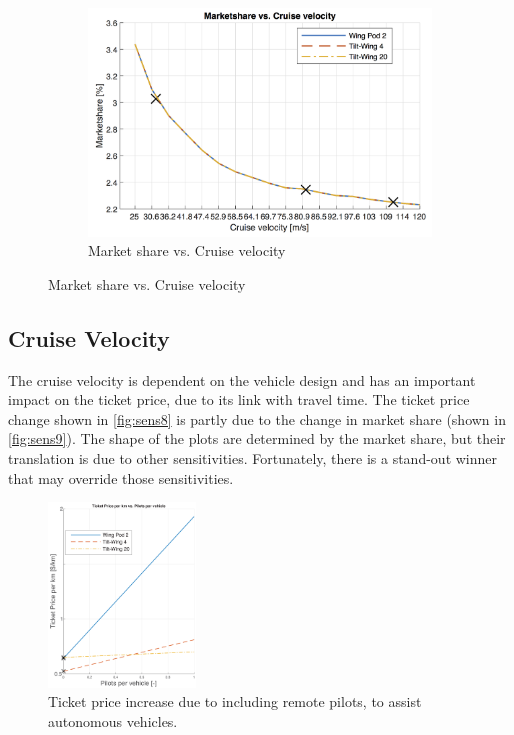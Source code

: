 \begin{figure}[h]
\begin{subfigure}[t]{0.33\textwidth}
    \includegraphics[width=\textwidth]{Figures/cruise_marketshare.png}
    \captionsetup{justification=centering}
    \caption{Market share vs. Cruise velocity}
    \label{fig:sens9}
\end{subfigure}
\captionsetup{justification=centering}
\end{figure}

\subsection{Cruise Velocity}
The cruise velocity is dependent on the vehicle design and has an important impact on the ticket price, due to its link with travel time. The ticket price change shown in \autoref{fig:sens8} is partly due to the change in market share (shown in \autoref{fig:sens9}). The shape of the plots are determined by the market share, but their translation is due to other sensitivities. Fortunately, there is a stand-out winner that may override those sensitivities.

\begin{figure}
    \centering
    \includegraphics[width=0.35\textwidth]{Figures/autonomous_TPrice_perkm.png}
    \captionsetup{justification=centering}
    \caption{Ticket price increase due to including remote pilots, to assist autonomous vehicles.}
\label{fig:autocost}
\end{figure}


